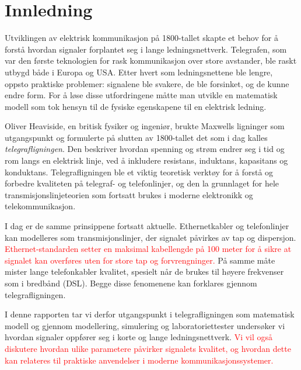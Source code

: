 \section{Innledning}

Utviklingen av elektrisk kommunikasjon på 1800-tallet skapte et behov for å forstå hvordan 
signaler forplantet seg i lange ledningsnettverk. Telegrafen, som var den første teknologien 
for rask kommunikasjon over store avstander, ble raskt utbygd både i Europa og USA. Etter hvert 
som ledningsnettene ble lengre, oppsto praktiske problemer: signalene ble svakere, de ble 
forsinket, og de kunne endre form. For å løse disse utfordringene måtte man utvikle en matematisk 
modell som tok hensyn til de fysiske egenskapene til en elektrisk ledning.

Oliver Heaviside, en britisk fysiker og ingeniør, brukte Maxwells ligninger som utgangspunkt og 
formulerte på slutten av 1800-tallet det som i dag kalles \textit{telegrafligningen}. Den beskriver 
hvordan spenning og strøm endrer seg i tid og rom langs en elektrisk linje, ved å inkludere 
resistans, induktans, kapasitans og konduktans. Telegrafligningen ble et viktig teoretisk verktøy 
for å forstå og forbedre kvaliteten på telegraf- og telefonlinjer, og den la grunnlaget for hele 
transmisjonslinjeteorien som fortsatt brukes i moderne elektronikk og telekommunikasjon.

I dag er de samme prinsippene fortsatt aktuelle. Ethernetkabler og telefonlinjer kan modelleres 
som transmisjonslinjer, der signalet påvirkes av tap og dispersjon. \textcolor{red}{Ethernet-standarden setter en 
maksimal kabellengde på 100 meter for å sikre at signalet kan overføres uten for store tap og 
forvrengninger.} På samme måte mister lange telefonkabler kvalitet, spesielt når de brukes til høyere 
frekvenser som i bredbånd (DSL). Begge disse fenomenene kan forklares gjennom telegrafligningen.

I denne rapporten tar vi derfor utgangspunkt i telegrafligningen som matematisk modell og gjennom 
modellering, simulering og laboratoriettester undersøker vi hvordan signaler oppfører seg i korte og 
lange ledningsnettverk. \textcolor{red}{ Vi vil også diskutere hvordan ulike parametere påvirker 
signalets kvalitet, og hvordan dette kan relateres til praktiske anvendelser i moderne kommunikasjonssystemer.}